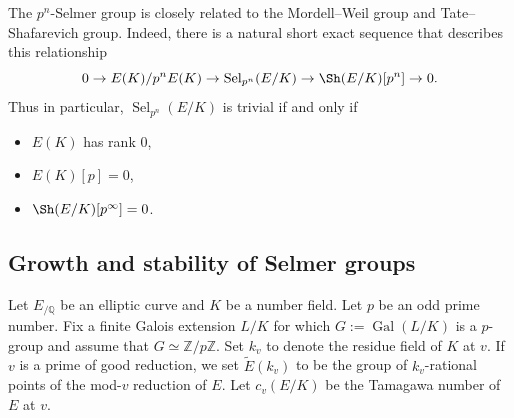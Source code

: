 \documentclass[12pt]{amsart}
\newcommand{\Z}{\mathbb{Z}}
\newcommand{\Q}{\mathbb{Q}}
\newcommand{\op}[1]{\operatorname{#1}}
\numberwithin{equation}{section}
\begin{document}
The $p^n$-Selmer group is closely related to the Mordell--Weil group and Tate--Shafarevich group.  Indeed, there is a natural short exact sequence that describes this relationship
\[0\rightarrow E(K)/p^n E(K)  \rightarrow \op{Sel}_{p^n}(E/K)\rightarrow \Sh(E/K)[p^n]\rightarrow 0.\]
Thus in particular, $\op{Sel}_{p^n}(E/K)$ is trivial if and only if 
\begin{itemize}
    \item $E(K)$ has rank $0$, 
    \item $E(K)[p]=0$, 
    \item $\Sh(E/K)[p^\infty]=0$.
\end{itemize}


\subsection{Growth and stability of Selmer groups}

\par Let $E_{/\Q}$ be an elliptic curve and $K$ be a number field. Let $p$ be an odd prime number. Fix a finite Galois extension $L/K$ for which $G:=\op{Gal}(L/K)$ is a $p$-group and assume that $G\simeq \Z/p\Z$. Set $k_v$ to denote the residue field of $K$ at $v$. If $v$ is a prime of good reduction, we set $\widetilde{E}(k_v)$ to be the group of $k_v$-rational points of the mod-$v$ reduction of $E$. Let $c_v(E/K)$ be the Tamagawa number of $E$ at $v$.
\end{document}
